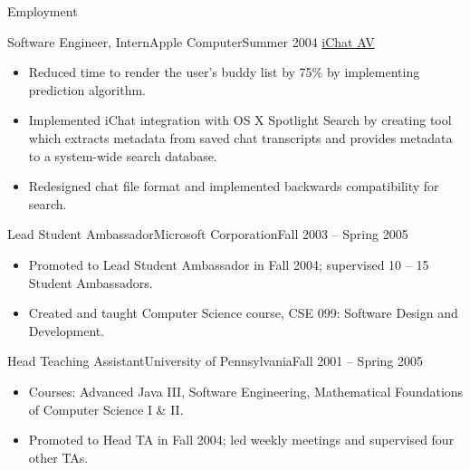 \documentclass[]{mcdowellcv_updated}
\begin{document}
	\makenameheader

	\makeheader
	
	\begin{cvsection}{Employment}
		\begin{cvsubsection}{Software Engineer, Intern}{Apple Computer}{Summer 2004}
			\href{https://www.github.com/gayle_mcdowell_example/project_link1}{iChat AV \textcolor{custom_dark_blue}{\ExternalLink}}			
			\begin{itemize}
				\item Reduced time to render the user’s buddy list by 75\% by implementing prediction algorithm.
				\item Implemented iChat integration with OS X Spotlight Search by creating tool which extracts metadata from saved chat transcripts and provides metadata to a system-wide search database.
				\item Redesigned chat file format and implemented backwards compatibility for search.
			\end{itemize}
		\end{cvsubsection}
		
		\begin{cvsubsection}{Lead Student Ambassador}{Microsoft Corporation}{Fall 2003 -- Spring 2005}	
			\begin{itemize}
				\item Promoted to Lead Student Ambassador in Fall 2004; supervised 10 -- 15 Student Ambassadors.
				\item Created and taught Computer Science course, CSE 099: Software Design and Development.
			\end{itemize}
		\end{cvsubsection}
		
		\begin{cvsubsection}{Head Teaching Assistant}{University of Pennsylvania}{Fall 2001 -- Spring 2005}		
			\begin{itemize}
				\item Courses: Advanced Java III, Software Engineering, Mathematical Foundations of Computer Science I \& II.
				\item Promoted to Head TA in Fall 2004; led weekly meetings and supervised four other TAs.
			\end{itemize}
		\end{cvsubsection}
		

\end{cvsection}
\end{document}
